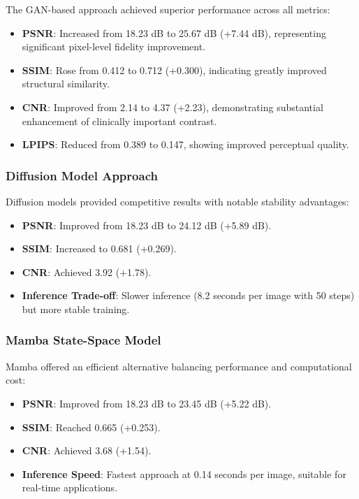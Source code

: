 \documentclass[10pt,conference,letterpaper]{IEEEtran}
\begin{document}
The GAN-based approach achieved superior performance across all metrics:

\begin{itemize}
  \item \textbf{PSNR}: Increased from 18.23 dB to 25.67 dB (+7.44 dB), representing significant pixel-level fidelity improvement.
  
  \item \textbf{SSIM}: Rose from 0.412 to 0.712 (+0.300), indicating greatly improved structural similarity.
  
  \item \textbf{CNR}: Improved from 2.14 to 4.37 (+2.23), demonstrating substantial enhancement of clinically important contrast.
  
  \item \textbf{LPIPS}: Reduced from 0.389 to 0.147, showing improved perceptual quality.
\end{itemize}

\subsubsection{Diffusion Model Approach}

Diffusion models provided competitive results with notable stability advantages:

\begin{itemize}
  \item \textbf{PSNR}: Improved from 18.23 dB to 24.12 dB (+5.89 dB).
  
  \item \textbf{SSIM}: Increased to 0.681 (+0.269).
  
  \item \textbf{CNR}: Achieved 3.92 (+1.78).
  
  \item \textbf{Inference Trade-off}: Slower inference (8.2 seconds per image with 50 steps) but more stable training.
\end{itemize}

\subsubsection{Mamba State-Space Model}

Mamba offered an efficient alternative balancing performance and computational cost:

\begin{itemize}
  \item \textbf{PSNR}: Improved from 18.23 dB to 23.45 dB (+5.22 dB).
  
  \item \textbf{SSIM}: Reached 0.665 (+0.253).
  
  \item \textbf{CNR}: Achieved 3.68 (+1.54).
  
  \item \textbf{Inference Speed}: Fastest approach at 0.14 seconds per image, suitable for real-time applications.
\end{itemize}
\end{document}
